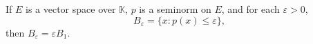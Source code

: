 If $E$ is a vector space over $\mathbb{K}$, $p$ is a seminorm on $E$, and for each $\varepsilon > 0$,
$$B_{\varepsilon} = \{x : p(x) \leq \varepsilon\},$$
then $B_{\varepsilon} = \varepsilon B_1$.
